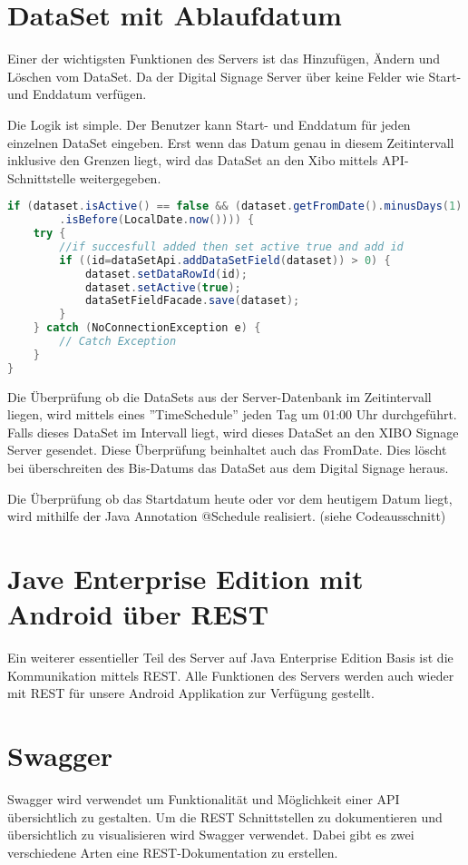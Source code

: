 \section{DataSet mit Ablaufdatum}\label{sec:datasetexpiredate}
Einer der wichtigsten Funktionen des Servers ist das Hinzufügen, Ändern und Löschen vom DataSet. Da der Digital Signage Server über keine Felder wie Start- und Enddatum verfügen.

Die Logik ist simple. Der Benutzer kann Start- und Enddatum für jeden einzelnen DataSet eingeben. Erst wenn das Datum genau in diesem Zeitintervall inklusive den Grenzen liegt, wird das DataSet an den Xibo mittels API-Schnittstelle weitergegeben. 

\begin{lstlisting}[language=Java, caption={public void doCheckEvery24Hours()}]
if (dataset.isActive() == false && (dataset.getFromDate().minusDays(1)
        .isBefore(LocalDate.now()))) {
    try {
        //if succesfull added then set active true and add id
        if ((id=dataSetApi.addDataSetField(dataset)) > 0) {
            dataset.setDataRowId(id);
            dataset.setActive(true);
            dataSetFieldFacade.save(dataset);
        }
    } catch (NoConnectionException e) {
        // Catch Exception
    }
}
\end{lstlisting}

Die Überprüfung ob die DataSets aus der Server-Datenbank im Zeitintervall liegen, wird mittels eines ''TimeSchedule'' jeden Tag um 01:00 Uhr durchgeführt. Falls dieses DataSet im Intervall liegt, wird dieses DataSet an den XIBO Signage Server gesendet. Diese Überprüfung beinhaltet auch das FromDate. Dies löscht bei überschreiten des Bis-Datums das DataSet aus dem Digital Signage heraus. 

Die Überprüfung ob das Startdatum heute oder vor dem heutigem Datum liegt, wird mithilfe der Java Annotation @Schedule realisiert. (siehe Codeausschnitt) 

\section{Jave Enterprise Edition mit Android über REST}\label{sec:javaeeandroidrest}
Ein weiterer essentieller Teil des Server auf Java Enterprise Edition Basis ist die Kommunikation mittels REST. Alle Funktionen des Servers werden auch wieder mit REST für unsere Android Applikation zur Verfügung gestellt. 

\section{Swagger}\label{sec:javaeeandroidrestswagger}
Swagger wird verwendet um Funktionalität und Möglichkeit einer API übersichtlich zu gestalten. Um die REST Schnittstellen zu dokumentieren und übersichtlich zu visualisieren wird Swagger verwendet. Dabei gibt es zwei verschiedene Arten eine REST-Dokumentation zu erstellen. 

